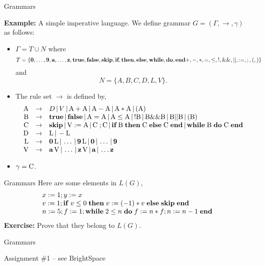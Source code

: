 \documentclass{beamer}
\begin{document}
\begin{frame}[fragile]{Grammars}

\scriptsize
{\bf Example:} A simple imperative language.  We define grammar $G=(\Gamma,\rightarrow,\gamma)$ as follows:
\begin{itemize}
\item $\Gamma = T \cup N$ where
{\tiny
\[
T =\{\mbox{\bf 0},\ldots,\mbox{\bf 9},\mbox{\bf a},\ldots,\mbox{\bf z},\mbox{\bf true},\mbox{\bf false},\mbox{\bf skip},
\mbox{\bf if},\mbox{\bf then},\mbox{\bf else},\mbox{\bf while},\mbox{\bf do},\mbox{\bf end}+,-,*,=,\le,!,\&\&,||,:=,;,(,)\}
\]
}
and
{\tiny
\[
N = \{A,B,C,D,L,V\}.
\]
}
\item The rule set $\rightarrow$ is defined by,
{\tiny
\[
\begin{array}{rcl}
\mbox{A} &\rightarrow& D \,|\, V \,|\, \mbox{A} +\mbox{A} \,|\, \mbox{A} - \mbox{A} \,|\,
	\mbox{A} * \mbox{A}\,|\, ( \mbox{A} )\\

\mbox{B} &\rightarrow& \mbox{\bf true} \,|\, \mbox{\bf false} \,|\, \mbox{A} = \mbox{A} \,|\,
	\mbox{A} \le \mbox{A} \,|\, ! \mbox{B} \,|\, \mbox{B} \&\& \mbox{B} \,|\,
	\mbox{B} || \mbox{B} \,|\, (\mbox{B})\\

\mbox{C} &\rightarrow& \mbox{\bf skip} \,|\, \mbox{V} := \mbox{A} \,|\,\mbox{C}\; ; \mbox{C} \,|\,
	\mbox{\bf if} \; \mbox{B}\; \mbox{\bf then}\;\mbox{C}\; \mbox{\bf else}\; \mbox{C} \; \mbox{\bf end}\,|\,
	\mbox{\bf while}\; \mbox{B}\; \mbox{\bf  do}\; \mbox{C}\; \mbox{\bf end}\\

\mbox{D} &\rightarrow& \mbox{L} \,|\, - \mbox{L}\\

\mbox{L} &\rightarrow& \mbox{\bf 0}\, \mbox{L} \,|\, \ldots \,|\,  \mbox{\bf 9} \,\mbox{L} \,|\, \mbox{\bf 0} \,|\, \ldots\,|\,\mbox{\bf 9}\\

\mbox{V} &\rightarrow& \mbox{\bf a}\,\mbox{V} \,|\, \ldots\,|\, \mbox{\bf z}\,\mbox{V} \,|\, \mbox{\bf a} \,|\, \ldots \mbox{\bf z}
\end{array}
\]
}
\item $\gamma =\mbox{C}$.
\end{itemize}
\end{frame}

\begin{frame}{Grammars}
Here are some elements in $L(G)$,
\[
\begin{array}{l}
x := 1 ; y := x\\
v := 1; {\bf if}\; {v \le 0}\;{\bf then}\;{v := (-1)*v}\;{\bf else}\;{\mbox{\bf skip}}\;\mbox{\bf end}\\
n := 5 ; f := 1 ; {\bf while}\; {2 \le n}\;{\bf do}\;{f := n*f ; n := n - 1}\; \mbox{\bf end}
\end{array}
\]
{\bf Exercise:} Prove that they belong to $L(G)$.

\end{frame}

\begin{frame}{Grammars}

Assignment \#1 -- see BrightSpace

\end{frame}
\end{document}
